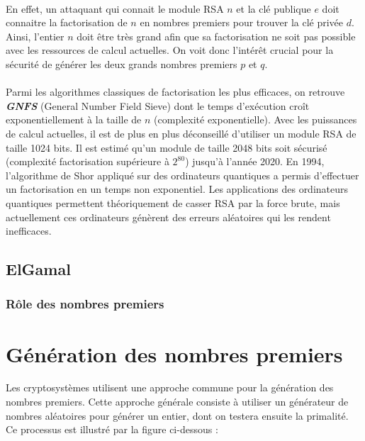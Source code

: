 			\paragraph{}En effet, un attaquant qui connait le module RSA $n$ et la clé publique $e$ doit connaitre la factorisation de $n$ en nombres premiers pour trouver la clé privée $d$. Ainsi, l'entier $n$ doit être très grand afin que sa factorisation ne soit pas possible avec les ressources de calcul actuelles. On voit donc l'intérêt crucial pour la sécurité de générer les deux grands nombres premiers $p$ et $q$.
			\paragraph{}Parmi les algorithmes classiques de factorisation les plus efficaces, on retrouve \textbf{\textit{GNFS}} (General Number Field Sieve) dont le temps d'exécution croît exponentiellement à la taille de $n$ (complexité exponentielle). Avec les puissances de calcul actuelles, il est de plus en plus déconseillé d'utiliser un module RSA de taille 1024 bits. Il est estimé qu'un module de taille 2048 bits soit sécurisé (complexité factorisation supérieure à $2^{80}$) jusqu'à l'année 2020. 
			En 1994, l'algorithme de Shor appliqué sur des ordinateurs quantiques a permis d'effectuer un factorisation en un temps non exponentiel. Les applications des ordinateurs quantiques permettent théoriquement de casser RSA par la force brute, mais actuellement ces ordinateurs génèrent des erreurs aléatoires qui les rendent inefficaces.
			
		
		\subsection{ElGamal}
		
			\subsubsection*{Rôle des nombres premiers}
		
	
	
	\section{Génération des nombres premiers}
	
		Les cryptosystèmes utilisent une approche commune pour la génération des nombres premiers. Cette approche générale consiste à utiliser un générateur de nombres aléatoires pour générer un entier, dont on testera ensuite la primalité. Ce processus est illustré par la figure ci-dessous :
		
